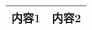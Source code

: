 \documentclass{ctexart}
\begin{document}
\begin{longtable}{|c|c|}
\hline
\rowcolor{gray!20} 内容1 & 内容2\footnotemark \\
\hline
\end{longtable}
\end{document}
